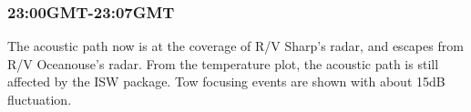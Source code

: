 \subsubsection{23:00GMT-23:07GMT}
The acoustic path now is at the coverage of R/V Sharp's radar, and
escapes from R/V Oceanouse's radar. From the temperature plot, the
acoustic path is still affected by the ISW package. Tow focusing
events are shown with about 15dB fluctuation.
